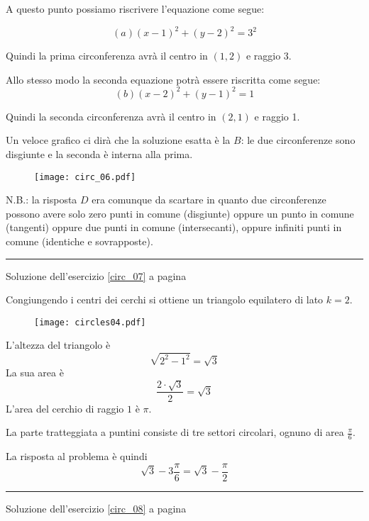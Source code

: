 A questo punto possiamo riscrivere l'equazione come segue:

\[
(a) (x-1)^2+(y-2)^2=3^2
\]

Quindi la prima circonferenza avrà il centro in $(1, 2)$ e raggio 3.

Allo stesso modo la seconda equazione potrà essere riscritta come segue:
\[
(b) (x-2)^2+(y-1)^2=1
\]

Quindi la seconda circonferenza avrà il centro in $(2, 1)$ e raggio 1.

Un veloce grafico ci dirà che la soluzione esatta è la $B$:
le due circonferenze sono disgiunte e la seconda è interna alla prima.

\begin{figure}[H]
\centering
\texttt{[image: circ\_06.pdf]}
\end{figure}

N.B.: la risposta $D$ era comunque da scartare in quanto due circonferenze
possono avere solo zero punti in comune (disgiunte) oppure un
punto in comune (tangenti) oppure due punti in comune (intersecanti),
oppure infiniti punti in comune (identiche e sovrapposte).



\vspace{1cm}
\hrule
\vspace{1cm}


Soluzione dell'esercizio \ref{circ_07} a pagina \pageref{circ_07}\label{circs_07}

Congiungendo i centri dei cerchi si ottiene un triangolo equilatero di lato $k=2$.


\begin{figure}[H]
\centering
\texttt{[image: circles04.pdf]}
\end{figure}

L'altezza del triangolo è \[\sqrt{2^2-1^2}=\sqrt{3}\]
La sua area è \[\frac{2\cdot\sqrt{3}}{2}=\sqrt{3}\]
L'area del cerchio di raggio $1$ è $\pi$.

La parte tratteggiata a puntini consiste di tre settori circolari,
ognuno di area $\frac{\pi}{6}$.

La risposta al problema è quindi \[\sqrt{3}-3\frac{\pi}{6}=\sqrt{3}-\frac{\pi}{2}\]


\vspace{1cm}
\hrule
\vspace{1cm}


 Soluzione dell'esercizio \ref{circ_08} a pagina \pageref{circ_08}\label{circs_08}

